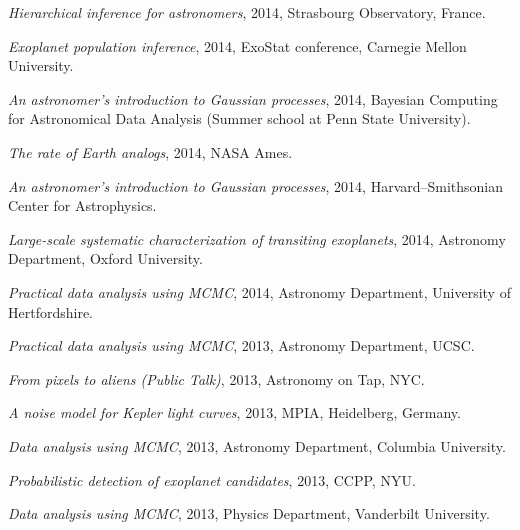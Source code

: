 \documentclass[12pt,letterpaper]{article}
\begin{document}
\begin{list}{}{\cvlist}
\item \emph{Hierarchical inference for astronomers},
    2014, Strasbourg Observatory, France.

\item \emph{Exoplanet population inference},
    2014, ExoStat conference, Carnegie Mellon University.

\item \emph{An astronomer's introduction to Gaussian processes},
    2014, Bayesian Computing for Astronomical Data Analysis (Summer school at
    Penn State University).

\item \emph{The rate of Earth analogs},
    2014, NASA Ames.

\item \emph{An astronomer's introduction to Gaussian processes},
    2014, Harvard--Smithsonian Center for Astrophysics.

\item \emph{Large-scale systematic characterization of transiting exoplanets},
    2014, Astronomy Department, Oxford University.

\item \emph{Practical data analysis using MCMC},
    2014, Astronomy Department, University of Hertfordshire.

\item \emph{Practical data analysis using MCMC},
    2013, Astronomy Department, UCSC.

\item \emph{From pixels to aliens (Public Talk)},
    2013, Astronomy on Tap, NYC.

\item \emph{A noise model for Kepler light curves},
    2013, MPIA, Heidelberg, Germany.

\item \emph{Data analysis using MCMC},
    2013, Astronomy Department, Columbia University.

\item \emph{Probabilistic detection of exoplanet candidates},
    2013, CCPP, NYU.

\item \emph{Data analysis using MCMC},
    2013, Physics Department, Vanderbilt University.
\end{list}
\end{document}
